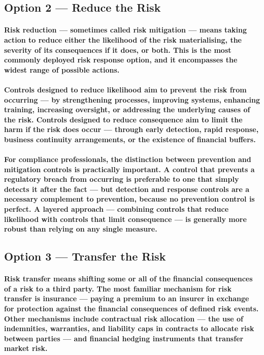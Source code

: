 \subsection{Option 2 — Reduce the Risk}
\paragraph{\textbf{Risk reduction} — sometimes called risk mitigation — means taking action to reduce either the likelihood of the risk materialising, the severity of its consequences if it does, or both. This is the most commonly deployed risk response option, and it encompasses the widest range of possible actions.}
\paragraph{Controls designed to reduce likelihood aim to prevent the risk from occurring — by strengthening processes, improving systems, enhancing training, increasing oversight, or addressing the underlying causes of the risk. Controls designed to reduce consequence aim to limit the harm if the risk does occur — through early detection, rapid response, business continuity arrangements, or the existence of financial buffers.}
\paragraph{For compliance professionals, the distinction between prevention and mitigation controls is practically important. A control that prevents a regulatory breach from occurring is preferable to one that simply detects it after the fact — but detection and response controls are a necessary complement to prevention, because no prevention control is perfect. A layered approach — combining controls that reduce likelihood with controls that limit consequence — is generally more robust than relying on any single measure.}

\subsection{Option 3 — Transfer the Risk}
\paragraph{\textbf{Risk transfer} means shifting some or all of the financial consequences of a risk to a third party. The most familiar mechanism for risk transfer is \textbf{insurance} — paying a premium to an insurer in exchange for protection against the financial consequences of defined risk events. Other mechanisms include contractual risk allocation — the use of indemnities, warranties, and liability caps in contracts to allocate risk between parties — and financial hedging instruments that transfer market risk.}
